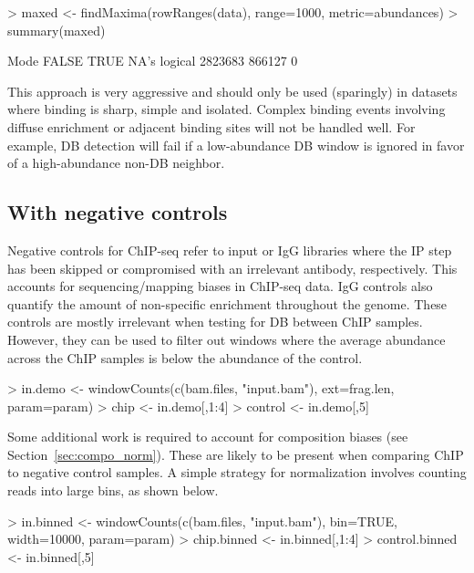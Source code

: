 \documentclass[12pt]{report}
\renewenvironment{Schunk}{\vspace{0pt}}{\vspace{0pt}}
\begin{document}
\begin{Schunk}
\begin{Sinput}
> maxed <- findMaxima(rowRanges(data), range=1000, metric=abundances)
> summary(maxed)
\end{Sinput}
\begin{Soutput}
   Mode   FALSE    TRUE    NA's 
logical 2823683  866127       0 
\end{Soutput}
\end{Schunk}

This approach is very aggressive and should only be used (sparingly) in datasets where binding is sharp, simple and isolated.
Complex binding events involving diffuse enrichment or adjacent binding sites will not be handled well.
For example, DB detection will fail if a low-abundance DB window is ignored in favor of a high-abundance non-DB neighbor.

\subsection{With negative controls}
Negative controls for ChIP-seq refer to input or IgG libraries where the IP step has been skipped or compromised with an irrelevant antibody, respectively. 
This accounts for sequencing/mapping biases in ChIP-seq data. 
IgG controls also quantify the amount of non-specific enrichment throughout the genome. 
These controls are mostly irrelevant when testing for DB between ChIP samples. 
However, they can be used to filter out windows where the average abundance across the ChIP samples is below the abundance of the control. 

\begin{Schunk}
\begin{Sinput}
> in.demo <- windowCounts(c(bam.files, "input.bam"), ext=frag.len, param=param)
> chip <- in.demo[,1:4]
> control <- in.demo[,5]
\end{Sinput}
\end{Schunk}

Some additional work is required to account for composition biases (see Section~\ref{sec:compo_norm}).
These are likely to be present when comparing ChIP to negative control samples.
A simple strategy for normalization involves counting reads into large bins, as shown below.

\begin{Schunk}
\begin{Sinput}
> in.binned <- windowCounts(c(bam.files, "input.bam"), bin=TRUE, width=10000, param=param)
> chip.binned <- in.binned[,1:4]
> control.binned <- in.binned[,5]
\end{Sinput}
\end{Schunk}
\end{document}
